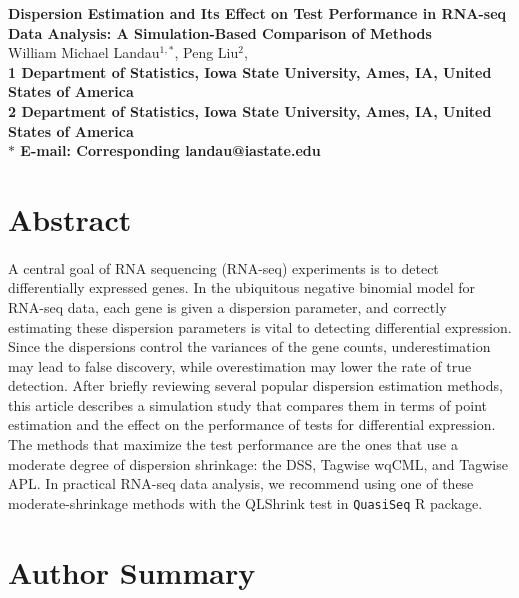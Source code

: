 \documentclass[10pt]{article}
\date{}
\begin{document}
\begin{flushleft}
{\Large
\textbf{Dispersion Estimation and Its Effect on Test Performance in RNA-seq Data Analysis: A Simulation-Based Comparison of Methods}
}
\\
William Michael Landau$^{1,\ast}$,
Peng Liu$^{2}$,
\\
\bf{1} Department of Statistics, Iowa State University, Ames, IA, United States of America
\\
\bf{2} Department of Statistics, Iowa State University, Ames, IA, United States of America
\\
$\ast$ E-mail: Corresponding landau@iastate.edu
\end{flushleft}

\section*{Abstract}

\paragraph{} \indent A central goal of RNA sequencing (RNA-seq) experiments is to detect differentially expressed genes. In the ubiquitous negative binomial model for RNA-seq data, each gene is given a dispersion parameter, and correctly estimating these dispersion parameters is vital to detecting differential expression. Since the dispersions control the variances of the gene counts, underestimation may lead to false discovery, while overestimation may lower the rate of true detection. After briefly reviewing several popular dispersion estimation methods, this article describes a simulation study that compares them in terms of point estimation and the effect on the performance of tests for differential expression. The methods that maximize the test performance are the ones that use a moderate degree of dispersion shrinkage: the DSS, Tagwise wqCML, and Tagwise APL. In practical RNA-seq data analysis, we recommend using one of these moderate-shrinkage methods with the QLShrink test in {\tt QuasiSeq} R package.

\section*{Author Summary}
\end{document}
